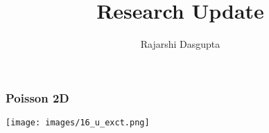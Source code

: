 \documentclass{beamer}
\title{Research Update}
\author{Rajarshi Dasgupta}
\institute{{\footnotesize PhD student} \\ AiREX}
\newcommand{\fr}[2]{
	\begin{frame}
		\frametitle{#1}
		#2
	\end{frame}
}
\begin{document}
\frame{\titlepage}

\fr{Poisson 2D}{
	\texttt{[image: images/16\_u\_exct.png]}
}
\end{document}
